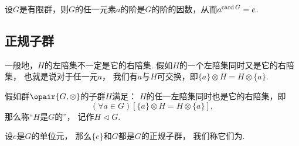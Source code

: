 \begin{corollary}
设\(G\)是有限群，则\(G\)的任一元素\(a\)的阶是\(G\)的阶的因数，从而\(a^{\operatorname{card} G}=e\).
\end{corollary}


\endgroup

\subsection{正规子群}
一般地，\(H\)的左陪集不一定是它的右陪集.
假如\(H\)的一个左陪集同时又是它的右陪集，
也就是说对于任一元\(a\)，
我们有\(a\)与\(H\)可交换，即\(\{a\} \otimes H = H \otimes \{a\}\).
\begin{definition}
假如群\(\opair{G,\otimes}\)的子群\(H\)满足：
\(H\)的任一左陪集同时也是它的右陪集，即\[
	(\forall a\in G)[\{a\} \otimes H = H \otimes \{a\}],
\]
那么称“\(H\)是\(G\)的”，
记作\(H \triangleleft G\).
\end{definition}

设\(e\)是\(G\)的单位元，
那么\(\{e\}\)和\(G\)都是\(G\)的正规子群，
我们称它们为.

